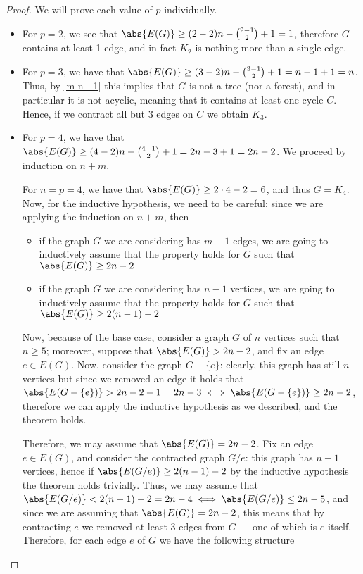 \documentclass[a4paper, 12pt]{report}
\begin{document}
    \begin{proof}
        We will prove each value of $p$ individually.

        \begin{itemize}
            \item For $p = 2$, we see that $\abs{E(G)} \ge (2 - 2)n - \binom{2 - 1}{2} + 1 = 1$, therefore $G$ contains at least 1 edge, and in fact $K_2$ is nothing more than a single edge.
            \item For $p = 3$, we have that $\abs{E(G)} \ge (3 - 2) n - \binom{3 - 1}{2} + 1 = n - 1 + 1 = n$. Thus, by \cref{m n - 1} this implies that $G$ is not a tree (nor a forest), and in particular it is not acyclic, meaning that it contains at least one cycle $C$. Hence, if we contract all but 3 edges on $C$ we obtain $K_3$.
            \item For $p = 4$, we have that $\abs{E(G)} \ge (4 - 2)n - \binom{4 - 1}{2} + 1 = 2n - 3 + 1 = 2n - 2$. We proceed by induction on $n + m$.

                For $n = p = 4$, we have that $\abs{E(G)} \ge 2 \cdot 4 - 2 = 6$, and thus $G = K_4$. Now, for the inductive hypothesis, we need to be careful: since we are applying the induction on $n + m$, then

                \begin{itemize}
                    \item if the graph $G$ we are considering has $m - 1$ edges, we are going to inductively assume that the property holds for $G$ such that $\abs{E(G)} \ge 2n - 2$
                    \item if the graph $G$ we are considering has $n - 1$ vertices, we are going to inductively assume that the property holds for $G$ such that $\abs{E(G)} \ge 2 (n - 1) - 2$
                \end{itemize}

                Now, because of the base case, consider a graph $G$ of $n$ vertices such that $n \ge 5$; moreover, suppose that $\abs{E(G)} > 2n - 2$, and fix an edge $e \in E(G)$. Now, consider the graph $G - \{e\}$: clearly, this graph has still $n$ vertices but since we removed an edge it holds that $\abs{E(G - \{e\})} > 2n - 2 - 1 = 2n - 3 \iff \abs{E(G - \{e\})} \ge 2n - 2$, therefore we can apply the inductive hypothesis as we described, and the theorem holds.

                Therefore, we may assume that $\abs{E(G)} = 2n - 2$. Fix an edge $e \in E(G)$, and consider the contracted graph $G/e$: this graph has $n - 1$ vertices, hence if $\abs{E(G/e)} \ge 2(n - 1) - 2$ by the inductive hypothesis the theorem holds trivially. Thus, we may assume that $\abs{E(G/e)} < 2(n - 1) - 2 = 2n - 4 \iff \abs{E(G/e)} \le 2n - 5$, and since we are assuming that $\abs{E(G)} = 2n - 2$, this means that by contracting $e$ we removed at least 3 edges from $G$ --- one of which is $e$ itself. Therefore, for each edge $e$ of $G$ we have the following structure


\end{itemize}
\end{proof}
\end{document}
